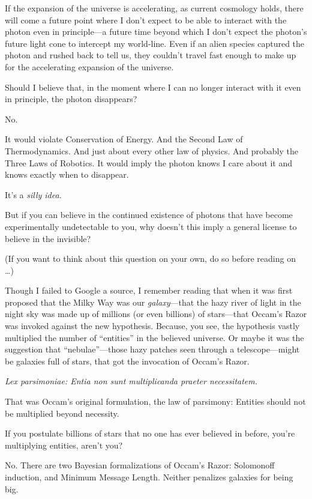 {
 If the expansion of the universe is accelerating, as current
cosmology holds, there will come a future point where I
don't expect to be able to interact with the photon
even in principle---a future time beyond which I don't
expect the photon's future light cone to intercept my
world-line. Even if an alien species captured the photon and rushed
back to tell us, they couldn't travel fast enough to
make up for the accelerating expansion of the universe.}

{
 Should I believe that, in the moment where I can no longer
interact with it even in principle, the photon disappears?}

{
 No.}

{
 It would violate Conservation of Energy. And the Second Law of
Thermodynamics. And just about every other law of physics. And probably
the Three Laws of Robotics. It would imply the photon knows I care
about it and knows exactly when to disappear.}

{
 It's a \textit{silly idea}.}

{
 But if you can believe in the continued existence of photons that
have become experimentally undetectable to you, why
doesn't this imply a general license to believe in the
invisible?}

{
 (If you want to think about this question on your own, do so
before reading on \ldots)}

{
 Though I failed to Google a source, I remember reading that when
it was first proposed that the Milky Way was our
\textit{galaxy}{}---that the hazy river of light in the night sky was
made up of millions (or even billions) of stars---that
Occam's Razor was invoked against the new hypothesis.
Because, you see, the hypothesis vastly multiplied the number of
``entities'' in the believed
universe. Or maybe it was the suggestion that
``nebulae''---those hazy patches
seen through a telescope---might be galaxies full of stars, that got
the invocation of Occam's Razor.}

{
 \textit{Lex parsimoniae: Entia non sunt multiplicanda praeter
necessitatem.}}

{
 That was Occam's original formulation, the law of
parsimony: Entities should not be multiplied beyond necessity.}

{
 If you postulate billions of stars that no one has ever believed
in before, you're multiplying entities,
aren't you?}

{
 No. There are two Bayesian formalizations of
Occam's Razor: Solomonoff induction, and Minimum
Message Length. Neither penalizes galaxies for being big.}

